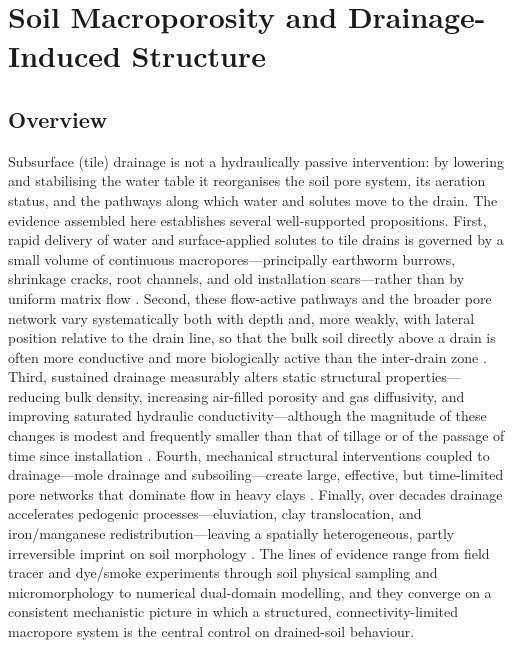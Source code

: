 \documentclass[11pt]{article}
\begin{document}
\section*{Soil Macroporosity and Drainage-Induced Structure}

\subsection{Overview}

Subsurface (tile) drainage is not a hydraulically passive intervention: by lowering
and stabilising the water table it reorganises the soil pore system, its aeration
status, and the pathways along which water and solutes move to the drain. The
evidence assembled here establishes several well-supported propositions. First,
rapid delivery of water and surface-applied solutes to tile drains is governed by a
small volume of continuous macropores---principally earthworm burrows, shrinkage
cracks, root channels, and old installation scars---rather than by uniform matrix
flow \parencite{Shipitalo2004,Stamm2002,Villholth1998,Zehe2001,Nielsen2015,Petersen2012}.
Second, these flow-active pathways and the broader pore network vary systematically
both with depth and, more weakly, with lateral position relative to the drain line,
so that the bulk soil directly above a drain is often more conductive and more
biologically active than the inter-drain zone \parencite{Shipitalo2004,Alakukku2010,Nielsen2015,Petersen2012,Montagne2009}.
Third, sustained drainage measurably alters static structural properties---reducing
bulk density, increasing air-filled porosity and gas diffusivity, and improving
saturated hydraulic conductivity---although the magnitude of these changes is modest
and frequently smaller than that of tillage or of the passage of time since
installation \parencite{HUNDAL1976,Nakajima2014,LAL1993,Frankl2023,Caron2025}.
Fourth, mechanical structural interventions coupled to drainage---mole drainage and
subsoiling---create large, effective, but time-limited pore networks that dominate
flow in heavy clays \parencite{MULLER1988,HARRIS1993,PLAMENAC1988,JHA1995,Castanheira2010}.
Finally, over decades drainage accelerates pedogenic processes---eluviation, clay
translocation, and iron/manganese redistribution---leaving a spatially heterogeneous,
partly irreversible imprint on soil morphology \parencite{Montagne2008,Montagne2010,Montagne2013,Mercier2000,YliHalla2009}.
The lines of evidence range from field tracer and dye/smoke experiments through soil
physical sampling and micromorphology to numerical dual-domain modelling, and they
converge on a consistent mechanistic picture in which a structured, connectivity-limited
macropore system is the central control on drained-soil behaviour.
\end{document}
